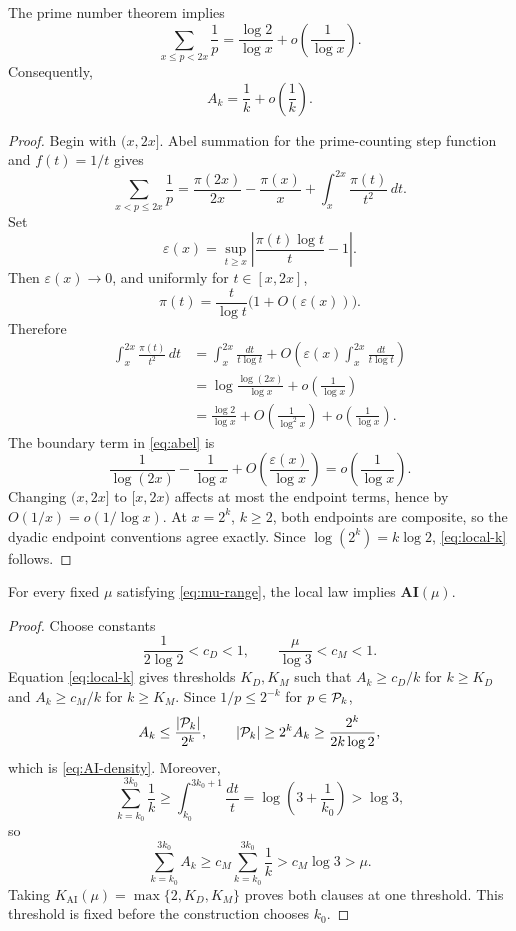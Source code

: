 \begin{proposition}\label{prop:local-law}
The prime number theorem implies
\begin{equation}\label{eq:local-x}
 \sum_{x\le p<2x}\frac1p
 =\frac{\log2}{\log x}
  +o\!\left(\frac1{\log x}\right).
\end{equation}
Consequently,
\begin{equation}\label{eq:local-k}
 A_k=\frac1k+o\!\left(\frac1k\right).
\end{equation}
\end{proposition}
\begin{proof}
Begin with $(x,2x]$.  Abel summation for the prime-counting step function and
$f(t)=1/t$ gives
\begin{equation}\label{eq:abel}
 \sum_{x<p\le2x}\frac1p
 =\frac{\pi(2x)}{2x}-\frac{\pi(x)}x
  +\int_x^{2x}\frac{\pi(t)}{t^2}\,dt.
\end{equation}
Set
\[
 \varepsilon(x)=\sup_{t\ge x}
 \left|\frac{\pi(t)\log t}{t}-1\right|.
\]
Then $\varepsilon(x)\to0$, and uniformly for $t\in[x,2x]$,
\[
 \pi(t)=\frac{t}{\log t}\bigl(1+O(\varepsilon(x))\bigr).
\]
Therefore
\begin{align*}
 \int_x^{2x}\frac{\pi(t)}{t^2}\,dt
 &=\int_x^{2x}\frac{dt}{t\log t}
   +O\!\left(\varepsilon(x)\int_x^{2x}\frac{dt}{t\log t}\right)\\
 &=\log\frac{\log(2x)}{\log x}
   +o\!\left(\frac1{\log x}\right)\\
 &=\frac{\log2}{\log x}
   +O\!\left(\frac1{\log^2x}\right)
   +o\!\left(\frac1{\log x}\right).
\end{align*}
The boundary term in \eqref{eq:abel} is
\[
 \frac1{\log(2x)}-\frac1{\log x}
 +O\!\left(\frac{\varepsilon(x)}{\log x}\right)
 =o\!\left(\frac1{\log x}\right).
\]
Changing $(x,2x]$ to $[x,2x)$ affects at most the endpoint terms, hence by
$O(1/x)=o(1/\log x)$.  At $x=2^k$, $k\ge2$, both endpoints are composite, so
the dyadic endpoint conventions agree exactly.  Since $\log(2^k)=k\log2$,
\eqref{eq:local-k} follows.
\end{proof}

\begin{proposition}\label{prop:PNT-AI}
For every fixed $\mu$ satisfying \eqref{eq:mu-range}, the local law implies
$\mathbf{AI}(\mu)$.
\end{proposition}
\begin{proof}
Choose constants
\[
 \frac1{2\log2}<c_D<1,
 \qquad
 \frac{\mu}{\log3}<c_M<1.
\]
Equation \eqref{eq:local-k} gives thresholds $K_D,K_M$ such that
$A_k\ge c_D/k$ for $k\ge K_D$ and $A_k\ge c_M/k$ for $k\ge K_M$.  Since
$1/p\le2^{-k}$ for $p\in\mathcal P_k$,
\[
 A_k\le\frac{|\mathcal P_k|}{2^k},
 \qquad
 |\mathcal P_k|\ge2^kA_k\ge\frac{2^k}{2k\log2},
\]
which is \eqref{eq:AI-density}.  Moreover,
\[
 \sum_{k=k_0}^{3k_0}\frac1k
 \ge\int_{k_0}^{3k_0+1}\frac{dt}{t}
 =\log\!\left(3+\frac1{k_0}\right)>\log3,
\]
so
\[
 \sum_{k=k_0}^{3k_0}A_k
 \ge c_M\sum_{k=k_0}^{3k_0}\frac1k
 >c_M\log3>\mu.
\]
Taking $K_{\mathrm{AI}}(\mu)=\max\{2,K_D,K_M\}$ proves both clauses at one
threshold.  This threshold is fixed before the construction chooses $k_0$.
\end{proof}

